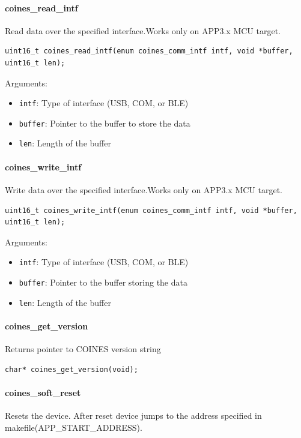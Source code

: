\paragraph{coines\_read\_intf}
Read data over the specified interface.Works only on APP3.x MCU target.

\begin{lstlisting}
uint16_t coines_read_intf(enum coines_comm_intf intf, void *buffer, uint16_t len);
\end{lstlisting}

Arguments:
\begin{itemize}
	\item \texttt{intf}: Type of interface (USB, COM, or BLE)
	\item \texttt{buffer}: Pointer to the buffer to store the data
	\item \texttt{len}: Length of the buffer
\end{itemize}

\paragraph{coines\_write\_intf}
Write data over the specified interface.Works only on APP3.x MCU target.

\begin{lstlisting}
uint16_t coines_write_intf(enum coines_comm_intf intf, void *buffer, uint16_t len);
\end{lstlisting}

Arguments:
\begin{itemize}
	\item \texttt{intf}: Type of interface (USB, COM, or BLE)
	\item \texttt{buffer}: Pointer to the buffer storing the data
	\item \texttt{len}: Length of the buffer
\end{itemize}

\paragraph{coines\_get\_version}
Returns pointer to COINES version string

\begin{lstlisting}
char* coines_get_version(void);
\end{lstlisting}

\paragraph{coines\_soft\_reset}
Resets the device. After reset device jumps to the address specified in makefile(APP\_START\_ADDRESS).

